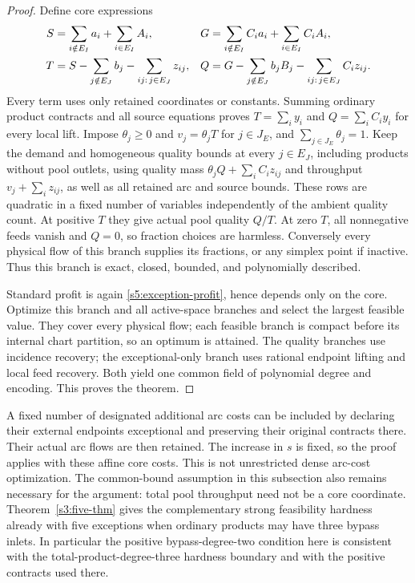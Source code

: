 \begin{proof}
Define core expressions
\begin{align}
 S&=\sum_{i\notin E_I}a_i+\sum_{i\in E_I}A_i,&
 G&=\sum_{i\notin E_I}C_i a_i+\sum_{i\in E_I}C_i A_i,\notag\\
 T&=S-\sum_{j\notin E_J}b_j-
                     \sum_{ij:\,j\in E_J}z_{ij},&
 Q&=G-\sum_{j\notin E_J}b_jB_j-
                     \sum_{ij:\,j\in E_J}C_i z_{ij}.
 \label{s5:exceptional-only-masses}
\end{align}
Every term uses only retained coordinates or constants. Summing
ordinary product contracts and all source equations proves
$T=\sum_i y_i$ and $Q=\sum_iC_i y_i$ for every local lift. Impose
$\theta_j\ge0$ and $v_j=\theta_jT$ for $j\in J_E$, and
$\sum_{j\in J_E}\theta_j=1$. Keep the demand and homogeneous quality
bounds at every $j\in E_J$, including products without pool outlets,
using quality mass
$\theta_jQ+\sum_iC_i z_{ij}$ and throughput $v_j+\sum_i z_{ij}$,
as well as all retained arc and source bounds. These rows are quadratic
in a fixed number of variables independently of the ambient quality
count. At positive $T$ they give actual pool quality $Q/T$. At zero
$T$, all nonnegative feeds vanish and $Q=0$, so fraction choices are
harmless. Conversely every physical flow of this branch supplies its
fractions, or any simplex point if inactive. Thus this branch is exact,
closed, bounded, and polynomially described.

Standard profit is again \eqref{s5:exception-profit}, hence depends
only on the core. Optimize this branch and all active-space branches
and select the largest feasible value. They cover every physical flow;
each feasible branch is compact before its internal chart partition,
so an optimum is attained. The quality branches use incidence recovery;
the exceptional-only branch uses rational endpoint lifting and local
feed recovery. Both yield one common field of polynomial degree and
encoding. This proves the theorem.
\end{proof}

A fixed number of designated additional arc costs can be included by
declaring their external endpoints exceptional and preserving their
original contracts there. Their actual arc flows are then retained.
The increase in $s$ is fixed, so the proof applies with these affine
core costs. This is not unrestricted dense arc-cost optimization.
The common-bound assumption in this subsection also remains necessary
for the argument: total pool throughput need not be a core coordinate.
Theorem~\ref{s3:five-thm} gives the complementary strong feasibility
hardness already with five exceptions when ordinary products may have
three bypass inlets. In particular the positive bypass-degree-two
condition here is consistent with the total-product-degree-three
hardness boundary and with the positive contracts used there.

